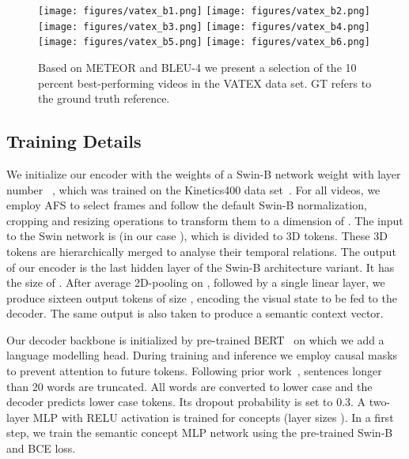 \documentclass[runningheads,table]{llncs}
\begin{document}
\begin{figure*}
    \centering

    \texttt{[image: figures/vatex\_b1.png]}
    \texttt{[image: figures/vatex\_b2.png]}
    \\
    \texttt{[image: figures/vatex\_b3.png]}
    \texttt{[image: figures/vatex\_b4.png]}
    \\
    \texttt{[image: figures/vatex\_b5.png]}
    \texttt{[image: figures/vatex\_b6.png]}
    \\
      
    \caption{Based on METEOR and BLEU-4 we present a selection of the 10 percent best-performing videos in the  VATEX data set. GT refers to the ground truth reference.
   }\label{fig:best-outvatex}
\end{figure*}



\subsection{Training Details}\label{tab:training}

We initialize our encoder with the weights of a Swin-B network weight with layer number ~\cite{liu2021swin}, which was trained on the Kinetics400 data set~\cite{kay2017kinetics}.
For all videos, we employ AFS to select  frames and follow the default Swin-B normalization, cropping and resizing operations to transform them to a dimension of . The input to the Swin network is  (in our case ), which is divided to  3D tokens. These 3D tokens are hierarchically merged to analyse their temporal relations.
The output of our encoder is the last hidden layer of the Swin-B architecture variant. It has the size of . After average 2D-pooling on , followed by a single linear layer, we produce sixteen output tokens of size , encoding the visual state to be fed to the decoder. The same output is also taken to produce a semantic context vector.


Our decoder backbone is initialized by pre-trained BERT~\cite{devlin2018bert} on which we add a language modelling head.
During training and inference we employ causal masks to prevent attention to future tokens.
Following prior work~\cite{chen2021motion,chen2018tvt,zhang2020object}, sentences longer than 20 words are truncated. All words are converted to lower case and the decoder predicts lower case tokens. Its dropout probability is set to 0.3.
A two-layer MLP with RELU activation is trained for  concepts (layer sizes ).
In a first step, we train the semantic concept MLP network using the pre-trained Swin-B and BCE loss.
\end{document}

